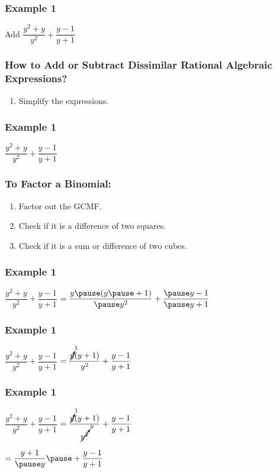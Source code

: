 \documentclass[14pt]{beamer}
\begin{document}
    \begin{frame}
    	\frametitle{Example 1}
    	Add $\dfrac{y^2+y}{y^2} + \dfrac{y-1}{y+1}$
    \end{frame}

    \begin{frame}
    	\frametitle{How to Add or Subtract Dissimilar Rational Algebraic Expressions?}
    	\begin{enumerate}
    		\item Simplify the expressions.
    	\end{enumerate}
    \end{frame}

    \begin{frame}
    	\frametitle{Example 1}
    	$\dfrac{y^2+y}{y^2} + \dfrac{y-1}{y+1}$
    \end{frame}

    \begin{frame}
    	\frametitle{To Factor a Binomial:}
    	\begin{enumerate}
    		\item<1-> Factor out the GCMF.
    		\item<2-> Check if it is a difference of two squares.
    		\item<3-> Check if it is a sum or difference of two cubes.
    	\end{enumerate}
    \end{frame}

    \begin{frame}
    	\frametitle{Example 1}
    	$\dfrac{y^2+y}{y^2} + \dfrac{y-1}{y+1}$
    	\pause $ = \dfrac{y \pause (y \pause + 1) }{\pause y^2} + \dfrac{\pause y-1}{\pause y+1}$
    \end{frame}

    \begin{frame}
    	\frametitle{Example 1}
    	$\dfrac{y^2+y}{y^2} + \dfrac{y-1}{y+1}$
    	$ = \dfrac{\cancelto{1}{y} (y + 1) }{y^2} + \dfrac{y-1}{y+1}$
    \end{frame}

    \begin{frame}
    	\frametitle{Example 1}
    	$\dfrac{y^2+y}{y^2} + \dfrac{y-1}{y+1}$
    	$ = \dfrac{\cancelto{1}{y} (y + 1) }{\cancelto{y}{y^2}} + \dfrac{y-1}{y+1}$
    	
    	\pause \vspace{1em}\hspace{1em} $ = \dfrac{y+1}{\pause y} \pause + \dfrac{y-1}{y+1} $
    \end{frame}
\end{document}
